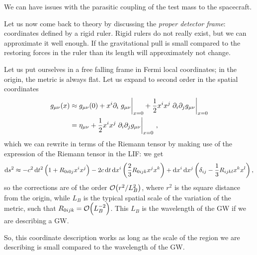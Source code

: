 \documentclass[main.tex]{subfiles}
\begin{document}
We can have issues with the parasitic coupling of the test mass to the spacecraft. 

Let us now come back to theory by discussing the \emph{proper detector frame}: coordinates defined by a rigid ruler. 
Rigid rulers do not really exist, but we can approximate it well enough. If the gravitational pull is small compared to the restoring forces in the ruler than its length will approximately not change. 

Let us put ourselves in a free falling frame in Fermi local coordinates; in the origin, the metric is always flat. Let us expand to second order in the spatial coordinates 
%
\begin{align}
g_{\mu \nu } (x) &\approx g_{\mu \nu } (0)
+ x^{i} \partial_{i} \eval{g_{\mu \nu }}_{x=0} 
+ \frac{1}{2} x^{i} x^{j} \eval{\partial_{i} \partial_{j} g_{\mu \nu }}_{x=0}  \\
&= \eta_{\mu \nu } + \frac{1}{2} x^{i} x^{j} \eval{\partial_{i} \partial_{j} g_{\mu \nu }}_{x=0}
\,,
\end{align}
%
which we can rewrite in terms of the Riemann tensor by making use of the expression of the Riemann tensor in the LIF: we get 
%
\begin{align}
\dd{s^2} \approx - c^2 \dd{t^2} \qty(1 + R_{0i0j} x^{i}x^{j})
-2 c \dd{t} \dd{x^{i}} \qty(\frac{2}{3}R_{0ijk} x^{j}x^{k})
+ \dd{x^{i}} \dd{x^{j}} \qty(\delta_{ij} - \frac{1}{3} R_{ijkl} x^{k} x^{l})
\,,
\end{align}
%
so the corrections are of the order \(\order{r^2 / L_B^2}\), where \(r^2\) is the square distance from the origin, while \(L_B\) is the typical spatial scale of the variation of the metric, such that \(R_{0ijk} = \order{L_B^{-2}}\). 
This \(L_B\) is the wavelength of the GW if we are describing a GW.

So, this coordinate description works as long as the scale of the region we are describing is small compared to the wavelength of the GW. 
\end{document}

